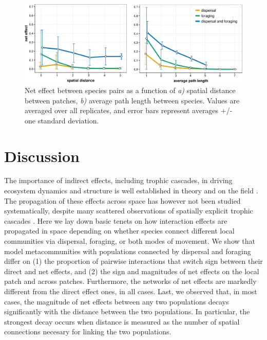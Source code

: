 \begin{figure}[ht]
\centering
\includegraphics[width=.9\textwidth,height=\textheight,keepaspectratio]{./Figures/chapter05/Fig_4.png}
\caption[Spatial decay of interaction effects]{\color{Gray}Net effect between species pairs as a function of \textit{a)} spatial distance between patches, \textit{b)} average path length between species. Values are averaged over all replicates, and error bars represent averages +/- one standard deviation.}\label{fig:fig5.4}
\end{figure}

\FloatBarrier

\section{Discussion}

The importance of indirect effects, including trophic cascades, in driving ecosystem dynamics and structure is well established in theory \citep{Abrams1992, Wootton2002, Gravel2010, Mayfield2017} and on the field \citep{Menge1995, Peacor1997, Moya-Larano2007, Barbosa2017, Trussell2017}. The propagation of these effects across space has however not been studied systematically, despite many scattered observations of spatially explicit trophic cascades \citep{Polis1997, Estes1998, Knight2005, Casini2012, Springer2018}. Here we lay down basic tenets on how interaction effects are propagated in space depending on whether species connect different local communities via dispersal, foraging, or both modes of movement. We show that model metacommunities with populations connected by dispersal and foraging differ on (1) the proportion of pairwise interactions that switch sign between their direct and net effects, and (2) the sign and magnitudes of net effects on the local patch and across patches. Furthermore, the networks of net effects are markedly different from the direct effect ones, in all cases. Last, we observed that, in most cases, the magnitude of net effects between any two populations decays significantly with the distance between the two populations. In particular, the strongest decay occurs when distance is measured as the number of spatial connections necesary for linking the two populations.

